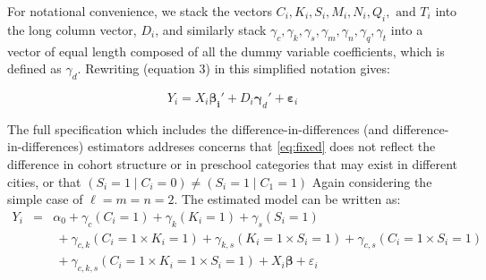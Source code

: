 \documentclass[10pt]{article}
\begin{document}
For notational convenience, we stack the vectors $C_i, K_i, S_i, M_i, N_i, Q_i, \text{ and } T_i$ into the long column vector, $D_i$, and similarly stack $\gamma_c, \gamma_k, \gamma_s, \gamma_m, \gamma_n, \gamma_q, \gamma_t $ into a vector of equal length composed of all the dummy variable coefficients, which is defined  as $\gamma_d$. Rewriting (equation 3) in this simplified notation gives:

\begin{equation}
Y_i = X_i \boldsymbol{\beta_i}' + D_i \boldsymbol{\gamma}_d' + \boldsymbol{\varepsilon}_{i}
\end{equation}

The full specification which includes the difference-in-differences (and difference-in-differences) estimators addreses concerns that \ref{eq:fixed} does not reflect the difference in cohort structure or in preschool categories that may exist in different cities, or that $(S_i = 1 \mid C_i = 0) \neq (S_i = 1 \mid C_1 =1)$ Again considering the simple case of $\ell = m = n = 2$. The estimated model can be written as:
\begin{eqnarray*}  \label{eq:specific2}
Y_i & = & \alpha_0  + \gamma_c (C_i = 1) + \gamma_k (K_i = 1) + \gamma_s (S_i = 1) \nonumber \\
& &\ + \gamma_{c,k} (C_i = 1 \times K_i = 1) + \gamma_{k,s} (K_i = 1 \times S_i = 1)  + \gamma_{c,s} (C_i = 1 \times S_i = 1)   \nonumber \\
 & &\ + \gamma_{c,k,s}(C_i = 1 \times K_i = 1 \times S_i = 1) + X_i \boldsymbol{\beta} + \varepsilon_i  
\end{eqnarray*}
\end{document}
